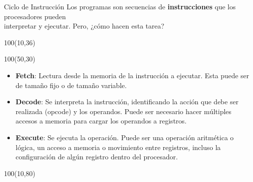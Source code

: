 \documentclass[aspectratio=169]{beamer}
\begin{document}
\begin{frame}[fragile,t]{Ciclo de Instrucción}
    Los programas son secuencias de \textbf{instrucciones} que los procesadores pueden\\ interpretar y ejecutar.
    Pero, \textcolor{naranjauca}{¿cómo hacen esta tarea?}\\
    \vspace{0.2cm}
    \begin{textblock}{100}(10,36)
    \end{textblock}
    \begin{textblock}{100}(50,30)
    \begin{itemize}
    \small \setlength\itemsep{0.3cm}
    \item<2-> \textbf{Fetch}:
    Lectura desde la memoria de la instrucción a ejecutar.
    Esta puede ser de tamaño fijo o de tamaño variable.
    \item<3-> \textbf{Decode}:
    Se interpreta la instrucción, identificando la acción que debe ser realizada (opcode) y los operandos.
    Puede ser necesario hacer múltiples accesos a memoria para cargar los operandos a registros.
    \item<4-> \textbf{Execute}:
    Se ejecuta la operación. Puede ser una operación aritmética o lógica, un acceso a memoria o movimiento entre registros, incluso la configuración de algún registro dentro del procesador.
    \end{itemize}
    \end{textblock}
    \begin{textblock}{100}(10,80)
    \end{textblock}
\end{frame}
\end{document}
